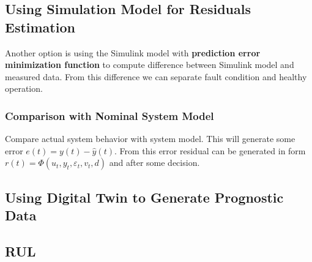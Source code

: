 \documentclass[class=article, crop=false]{standalone}
\begin{document}
\subsection{Using Simulation Model for Residuals
Estimation}\label{sec:residuals}

Another option is using the Simulink model with \textbf{prediction
error minimization function} to compute difference between Simulink model
and measured data. From this difference we can separate fault condition and
healthy operation. 


\subsubsection{Comparison with Nominal System Model}

Compare actual system behavior with system model. This will generate some
error $e(t) = y(t) - \hat{y}(t)$. From this error residual can be generated
in form $r(t)=\Phi(u_t,y_t, \varepsilon_t,v_t,d)$ and after some decision.

\subsection{Using Digital Twin to Generate Prognostic Data}


\subsection{RUL}
\end{document}
